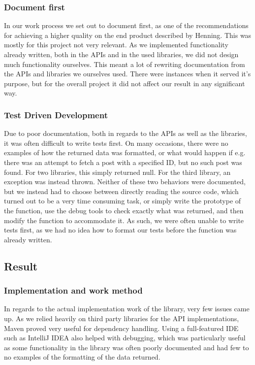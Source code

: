 \documentclass{sigchi-alternate}
\begin{document}
\subsubsection{Document first}
In our work process we set out to document first, as one of the recommendations for achieving a higher quality on the end product described by Henning\autocite{Henning:2007:ADM:1255421.1255422}. This was mostly for this project not very relevant. As we implemented functionality already written, both in the APIs and in the used libraries, we did not design much functionality ourselves. This meant a lot of rewriting documentation from the APIs and libraries we ourselves used. There were instances when it served it’s purpose, but
for the overall project it did not affect our result in any significant way.

\subsubsection{Test Driven Development}
Due to poor documentation, both in regards to the APIs as well as the libraries, it was often difficult to write tests first. On many occasions, there were no examples of how the returned data was formatted, or what would happen if e.g. there was an attempt to fetch
a post with a specified ID, but no such post was found. For two libraries, this simply returned null. For the third library, an exception was instead thrown. Neither of these two behaviors were documented, but we instead had to choose between directly reading the
source code, which turned out to be a very time consuming task, or simply write the prototype of the function, use the debug tools to check exactly what was returned, and then modify the function to accommodate it. As such, we were often unable to write tests first,
as we had no idea how to format our tests before the function was already written.

\subsection{Result}
\subsubsection{Implementation and work method}
In regards to the actual implementation work of the library, very few issues came up. As we relied heavily on third party libraries for the API implementations, Maven proved very useful for dependency handling. Using a full-featured IDE such as IntelliJ IDEA also
helped with debugging, which was particularly useful as some functionality in the library was often poorly documented and had few to no examples of the formatting of the data returned.
\end{document}
